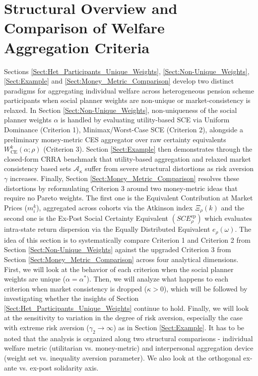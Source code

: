 \section{Structural Overview and Comparison of Welfare Aggregation Criteria}
\label{Sect:Structural_Synthesis}
Sections \ref{Sect:Het_Participants_Unique_Weights}, \ref{Sect:Non-Unique_Weights}, \ref{Sect:Example} and \ref{Sect:Money_Metric_Comparison} develop two distinct paradigms for aggregating individual welfare across heterogeneous pension scheme participants when social planner weights are non-unique or market-consistency is relaxed. In Section \ref{Sect:Non-Unique_Weights}, non-uniqueness of the social planner weights $\alpha$ is handled by evaluating utility-based SCE via Uniform Dominance (Criterion 1), Minimax/Worst-Case SCE (Criterion 2), alongside a preliminary money-metric CES aggregator over raw certainty equivalents $W_{\text{CE}}^k(\alpha; \rho)$ (Criterion 3). Section \ref{Sect:Example} then demonstrates through the closed-form CRRA benchmark that utility-based aggregation and relaxed market consistency based sets $\mathcal{A}_{\kappa}$ suffer from severe structural distortions as risk aversion $\gamma$ increases. Finally, Section \ref{Sect:Money_Metric_Comparison} resolves these distortions by reformulating Criterion 3 around two money-metric ideas that require no Pareto weights. The first one is the Equivalent Contribution at Market Prices ($m_i^k$), aggregated across cohorts via the Atkinson index $\Xi_\rho(k)$ and the second one is the Ex-Post Social Certainty Equivalent $(SCE_{\rho}^{\text{ep}})$ which evaluates intra-state return dispersion via the Equally Distributed Equivalent $e_\rho(\omega)$. The idea of this section is to systematically compare Criterion 1 and Criterion 2 from Section \ref{Sect:Non-Unique_Weights} against the upgraded Criterion 3 from Section \ref{Sect:Money_Metric_Comparison} across four analytical dimensions. First, we will look at the behavior of each criterion when the social planner weights are unique ($\alpha = \alpha^*$). Then, we will analyze what happens to each criterion when market consistency is dropped ($\kappa > 0$), which will be followed by investigating whether the insights of Section \ref{Sect:Het_Participants_Unique_Weights} continue to hold. Finally, we will look at the sensitivity to variation in the degree of risk aversion, especially the case with extreme risk aversion ($\gamma_2 \to \infty$) as in Section \ref{Sect:Example}. It has to be noted that the analysis is organized along two structural comparisons - individual welfare metric (utilitarian vs. money-metric) and interpersonal aggregation device (weight set vs. inequality aversion parameter). We also look at the orthogonal ex-ante vs. ex-post solidarity axis.

